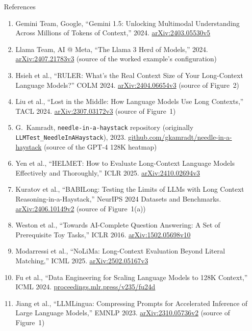 \begin{frame}[allowframebreaks,t]{References}
  \footnotesize
  \begin{enumerate}
    \item Gemini Team, Google, ``Gemini 1.5: Unlocking Multimodal Understanding Across Millions of Tokens of Context,'' 2024. \href{https://arxiv.org/abs/2403.05530v5}{arXiv:2403.05530v5}
    \item Llama Team, AI @ Meta, ``The Llama 3 Herd of Models,'' 2024. \href{https://arxiv.org/abs/2407.21783v3}{arXiv:2407.21783v3} (source of the worked example's configuration)
    \item Hsieh et al., ``RULER: What's the Real Context Size of Your Long-Context Language Models?'' COLM 2024. \href{https://arxiv.org/abs/2404.06654v3}{arXiv:2404.06654v3} (source of Figure~2)
    \item Liu et al., ``Lost in the Middle: How Language Models Use Long Contexts,'' TACL 2024. \href{https://arxiv.org/abs/2307.03172v3}{arXiv:2307.03172v3} (source of Figure~1)
    \item G.~Kamradt, \texttt{needle-in-a-haystack} repository (originally \texttt{LLMTest\_NeedleInAHaystack}), 2023. \href{https://github.com/gkamradt/needle-in-a-haystack}{github.com/gkamradt/needle-in-a-haystack} (source of the GPT-4 128K heatmap)
    \item Yen et al., ``HELMET: How to Evaluate Long-Context Language Models Effectively and Thoroughly,'' ICLR 2025. \href{https://arxiv.org/abs/2410.02694v3}{arXiv:2410.02694v3}
    \item Kuratov et al., ``BABILong: Testing the Limits of LLMs with Long Context Reasoning-in-a-Haystack,'' NeurIPS 2024 Datasets and Benchmarks. \href{https://arxiv.org/abs/2406.10149v2}{arXiv:2406.10149v2} (source of Figure~1(a))
    \item Weston et al., ``Towards AI-Complete Question Answering: A Set of Prerequisite Toy Tasks,'' ICLR 2016. \href{https://arxiv.org/abs/1502.05698v10}{arXiv:1502.05698v10}
    \item Modarressi et al., ``NoLiMa: Long-Context Evaluation Beyond Literal Matching,'' ICML 2025. \href{https://arxiv.org/abs/2502.05167v3}{arXiv:2502.05167v3}
    \item Fu et al., ``Data Engineering for Scaling Language Models to 128K Context,'' ICML 2024. \href{https://proceedings.mlr.press/v235/fu24d.html}{proceedings.mlr.press/v235/fu24d}
    \item Jiang et al., ``LLMLingua: Compressing Prompts for Accelerated Inference of Large Language Models,'' EMNLP 2023. \href{https://arxiv.org/abs/2310.05736v2}{arXiv:2310.05736v2} (source of Figure~1)

\end{enumerate}
\end{frame}
